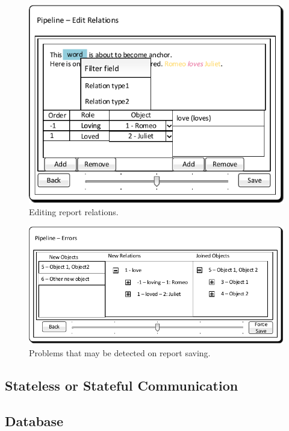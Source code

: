 \begin{figure}[!htb]
        \centering
        \includegraphics{Images/MockupPipelineRelations}
        \caption{Editing report relations.}
        \label{fig:MockupPipelineRelations}
\end{figure}

\begin{figure}[!htb]
        \centering
        \includegraphics{Images/MockupPipelineErrors}
        \caption{Problems that may be detected on report saving.}
        \label{fig:MockupPipelineErrors}
\end{figure}

\subsection{Stateless or Stateful Communication}


\subsection{Database}

